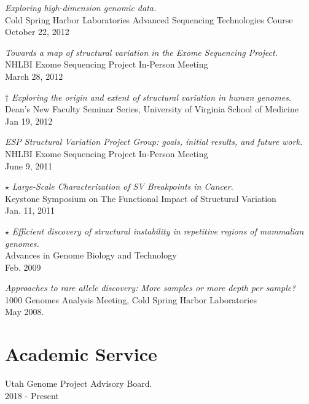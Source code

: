 \documentclass[margin,line]{cv}
\begin{document}
\begin{resume}
    \textit{Exploring high-dimension genomic data.} \\
    Cold Spring Harbor Laboratories Advanced Sequencing Technologies Course \\
    October 22, 2012

    \textit{Towards a map of structural variation in the Exome Sequencing Project.} \\
    NHLBI Exome Sequencing Project In-Person Meeting \\
    March 28, 2012

    $\dagger$ \textit{Exploring the origin and extent of structural variation in human genomes.} \\
    Dean’s New Faculty Seminar Series, University of Virginia School of Medicine \\
    Jan 19, 2012

    \textit{ESP Structural Variation Project Group: goals, initial results, and future work.} \\
    NHLBI Exome Sequencing Project In-Person Meeting \\
    June 9, 2011

    $\star$ \textit{Large-Scale Characterization of SV Breakpoints in Cancer.} \\
    Keystone Symposium on The Functional Impact of Structural Variation \\
    Jan. 11, 2011

    $\star$ \textit{Efficient discovery of structural instability in repetitive regions of mammalian genomes.} \\
    Advances in Genome Biology and Technology \\
    Feb. 2009

    \textit{Approaches to rare allele discovery: More samples or more depth per sample? } \\
    1000 Genomes Analysis Meeting, Cold Spring Harbor Laboratories \\
    May 2008.

    \section{\mysidestyle Academic Service}


    Utah Genome Project Advisory Board. \\
    2018 - Present


\end{resume}
\end{document}
